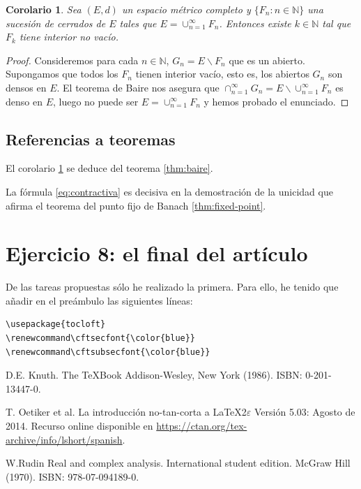 \documentclass[a4paper,10pt]{article}
\renewcommand\cftsecfont{\color{blue}}
\renewcommand\cftsubsecfont{\color{blue}}
\theoremstyle{teorema}
\newtheorem{coro}[teor]{Corolario}
\theoremstyle{plano}
\theoremstyle{titulo}
\begin{document}
\begin{coro} \label{cor:baire}
Sea $(E,d)$ un espacio métrico completo y $\{F_n:n\in\mathbb{N}\}$ una sucesión de cerrados de $E$ tales que $E=\cup_{n=1}^\infty F_n$. Entonces existe $k\in\mathbb{N}$ tal que $F_k$ tiene interior no vacío.
\end{coro}

\begin{proof}
Consideremos para cada $n\in\mathbb{N}$, $G_n=E\smallsetminus F_n$ que es un abierto. Supongamos que todos los $F_n$ tienen interior vacío, esto es, los abiertos $G_n$ son densos en $E$. El teorema de Baire nos asegura que $\cap_{n=1}^\infty G_n=E\smallsetminus\cup_{n=1}^\infty F_n$ es denso en $E$, luego no puede ser $E=\cup_{n=1}^\infty F_n$ y hemos probado el enunciado.
\end{proof}

\subsection*{Referencias a teoremas}

El corolario \ref{cor:baire} se deduce del teorema \ref{thm:baire}.

La fórmula \eqref{eq:contractiva} es decisiva en la demostración de la unicidad que afirma el teorema del punto fijo de Banach \ref{thm:fixed-point}.

\section{Ejercicio 8: el final del artículo}

De las tareas propuestas sólo he realizado la primera. Para ello, he tenido que añadir en el preámbulo las siguientes líneas:

\begin{verbatim}
\usepackage{tocloft}
\renewcommand\cftsecfont{\color{blue}}
\renewcommand\cftsubsecfont{\color{blue}}
\end{verbatim}

\begin{thebibliography}{aaaaaa}

 D.E. Knuth.
The \TeX{Book}
Addison-Wesley, New York (1986).
ISBN: 0-201-13447-0.

 T. Oetiker et al.
La introducción no-tan-corta a \LaTeX2$\varepsilon$
Versión 5.03: Agosto de 2014.
Recurso online disponible en \href{https://ctan.org/tex-archive/info/lshort/spanish}{https://ctan.org/tex-archive/info/lshort/spanish}.

 W.Rudin
 Real and complex analysis.
 International student edition. McGraw Hill (1970).
 ISBN: 978-07-094189-0.

\end{thebibliography}
\end{document}

